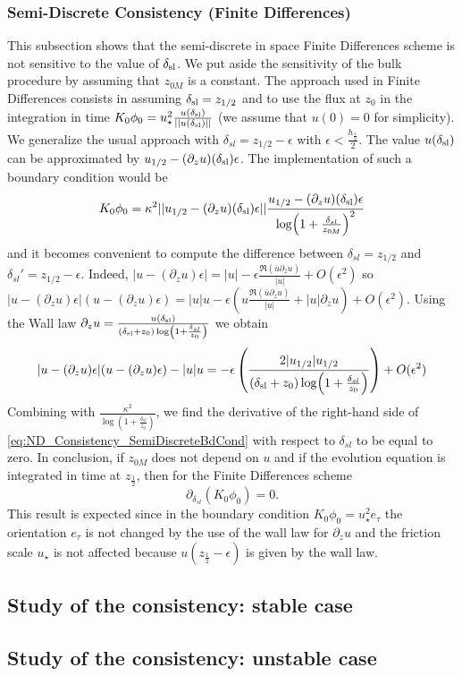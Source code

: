 \subsubsection{Semi-Discrete Consistency (Finite Differences)}
This subsection shows that the semi-discrete in space
Finite Differences
scheme is not sensitive to the value of $\delta_{\rm sl}$.
We put aside the sensitivity of the bulk procedure by
assuming that $z_{0M}$ is a constant.
%
The approach used in Finite Differences consists in assuming
$\delta_{\rm sl} = z_{1/2}$ and to use the flux at $z_0$ in
the integration in time
$K_0\phi_0 = u_\star^2
\frac{u(\delta_{\rm sl})}{||u(\delta_{\rm sl})||}$
(we assume that $u(0)=0$ for simplicity).
We generalize the usual approach with
$\delta_{sl} = z_{1/2} - \epsilon$ with
$\epsilon < \frac{h_{\frac{1}{2}}}{2}$. 
The value $u(\delta_{\rm sl})$ can be approximated
by $u_{1/2} - (\partial_z u)(\delta_{\rm sl})\epsilon$.
The implementation of such a boundary condition would be
\begin{equation}
	\label{eq:ND_Consistency_SemiDiscreteBdCond}
K_0\phi_0 = 
\kappa^2 ||u_{1/2} - (\partial_z u)(\delta_{\rm sl})\epsilon ||
	\frac{u_{1/2} - (\partial_z u)(\delta_{\rm sl})\epsilon 
}{\log(1+\frac{\delta_{sl}}{z_{0M}})^2}
\end{equation}
and it becomes convenient to compute the difference between
$\delta_{sl}=z_{1/2}$ and $\delta_{sl}'=z_{1/2}-\epsilon$.
Indeed,
$|u - (\partial_z u) \epsilon| = |u| -
\epsilon \frac{\mathfrak{R}(\overline{u} \partial_z u)}{|u|}
+ O(\epsilon^2)$ so
$|u - (\partial_z u) \epsilon|(u - (\partial_z u) \epsilon) =
|u|u -
\epsilon \left(
u\frac{\mathfrak{R}(\overline{u} \partial_z u)}{|u|}
+ |u| \partial_z u
\right)
+ O(\epsilon^2)$.
Using the Wall law
$\partial_z u=\frac{u(\delta_{\rm sl})}{(\delta_{\rm sl} + z_0)
\log(1+\frac{\delta_{sl}}{z_0})}$ we obtain 
\begin{equation}
|u - (\partial_z u) \epsilon|(u - (\partial_z u) \epsilon) - |u|u =
	- \epsilon \left(\frac{2|u_{1/2}|u_{1/2}}
	{(\delta_{\rm sl} + z_0) \log(1+\frac{\delta_{sl}}{z_0})}
	\right)+ O(\epsilon^2)
\end{equation}
Combining with $\frac{\kappa^2}{\log(1+\frac{\delta_{sl}}{z_0})}$,
we find the derivative of the right-hand side of
\eqref{eq:ND_Consistency_SemiDiscreteBdCond} with respect to
$\delta_{sl}$ to be equal to zero.
In conclusion, if $z_{0M}$ does not depend on $u$ and if
the evolution equation is integrated in time at $z_\frac{1}{2}$,
then for the Finite Differences scheme
\begin{equation}
	\partial_{\delta_{sl}} (K_0 \phi_0) = 0.
\end{equation}
This result is expected since in the boundary condition
$K_0 \phi_0 = u_\star^2 e_\tau$ the orientation $e_\tau$ is
not changed by the use of the wall law for $\partial_z u$
and the friction scale $u_\star$ is not affected because
$u(z_\frac{1}{2} - \epsilon)$ is given by the wall law.
\subsection{Study of the consistency: stable case}
\subsection{Study of the consistency: unstable case}
